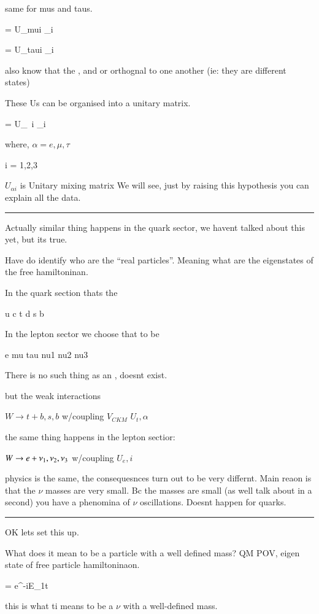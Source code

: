 {same for mus and taus. 

\be
\numu = U_mui \nu_i
\ee

\be
\nutau = U_taui \nu_i
\ee

also know that the \nue, \numu and \nutau or orthognal to one another (ie: they are different states) 

These Us can be organised into a unitary matrix. 

\be
\nualpha = U_{\alpha\ i} \nu_i
\ee

where, $\alpha = e, \mu, \tau$

i = 1,2,3

$U_{\alpha i}$ is Unitary mixing matrix
We will see, just by raising this hypothesis you can explain all the data.

\noindent\rule{\textwidth}{1pt}

Actually similar thing happens in the quark sector, we havent talked about this yet, but its true.

Have do identify who are the ``real particles''. 
Meaning what are the eigenstates of the free hamiltoninan.

In the quark section thats the 

u c t 
d s b

In the lepton sector we choose that to be 

e mu tau
nu1 nu2 nu3 

There is no such thing as an \nue, doesnt exist. 

but the weak interactions

$W \rightarrow t + b,s,b$ w/coupling $V_{CKM}$  $U_t,\alpha$

the same thing happens in the lepton sectior:


$W \rightarrow e + \nu_1,\nu_2,\nu_3$ w/coupling $U_e,i$

physics is the same,  the consequesnces turn out to be very differnt.  
Main reaon is that the $\nu$ masses  are very small. 
Bc the masses are small (as well talk about in a second) you have a phenomina of $\nu$ oscillations.
Doesnt happen for quarks. 

\noindent\rule{\textwidth}{1pt}

OK lets set this up. 

What does it mean to be a particle with a well defined mass?
QM POV, eigen state of free particle hamiltoninaon. 

\be
\ket{\nuone} =  e^{-iE_1t} \ket{\nuone}
\ee

this is what ti means to be a $\nu$ with a well-defined mass.

}
